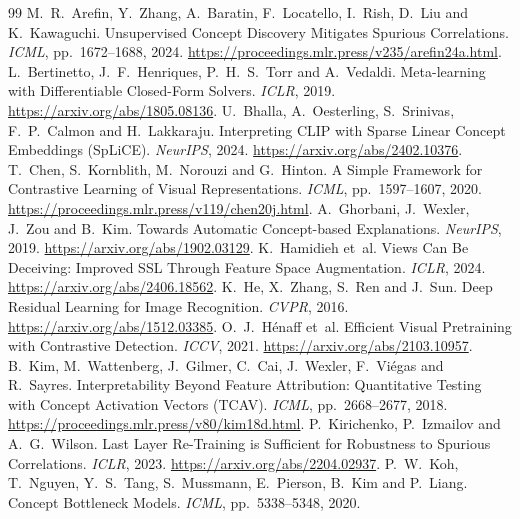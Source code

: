 \documentclass{article}
\begin{document}
\begingroup
\footnotesize
\setlength{\bibsep}{4pt plus 1pt}
\begin{thebibliography}{99}
M.~R.~Arefin, Y.~Zhang, A.~Baratin, F.~Locatello, I.~Rish, D.~Liu and K.~Kawaguchi.
Unsupervised Concept Discovery Mitigates Spurious Correlations.
\emph{ICML}, pp.~1672--1688, 2024.
\url{https://proceedings.mlr.press/v235/arefin24a.html}.
L.~Bertinetto, J.~F.~Henriques, P.~H.~S.~Torr and A.~Vedaldi.
Meta-learning with Differentiable Closed-Form Solvers. \emph{ICLR}, 2019.
\url{https://arxiv.org/abs/1805.08136}.
U.~Bhalla, A.~Oesterling, S.~Srinivas, F.~P.~Calmon and H.~Lakkaraju.
Interpreting CLIP with Sparse Linear Concept Embeddings (SpLiCE).
\emph{NeurIPS}, 2024. \url{https://arxiv.org/abs/2402.10376}.
T.~Chen, S.~Kornblith, M.~Norouzi and G.~Hinton.
A Simple Framework for Contrastive Learning of Visual Representations.
\emph{ICML}, pp.~1597--1607, 2020.
\url{https://proceedings.mlr.press/v119/chen20j.html}.
A.~Ghorbani, J.~Wexler, J.~Zou and B.~Kim.
Towards Automatic Concept-based Explanations. \emph{NeurIPS}, 2019.
\url{https://arxiv.org/abs/1902.03129}.
K.~Hamidieh et~al.
Views Can Be Deceiving: Improved SSL Through Feature Space Augmentation.
\emph{ICLR}, 2024. \url{https://arxiv.org/abs/2406.18562}.
K.~He, X.~Zhang, S.~Ren and J.~Sun.
Deep Residual Learning for Image Recognition. \emph{CVPR}, 2016.
\url{https://arxiv.org/abs/1512.03385}.
O.~J.~H\'enaff et~al.
Efficient Visual Pretraining with Contrastive Detection. \emph{ICCV}, 2021.
\url{https://arxiv.org/abs/2103.10957}.
B.~Kim, M.~Wattenberg, J.~Gilmer, C.~Cai, J.~Wexler, F.~Vi\'egas and R.~Sayres.
Interpretability Beyond Feature Attribution: Quantitative Testing with Concept Activation Vectors (TCAV).
\emph{ICML}, pp.~2668--2677, 2018. \url{https://proceedings.mlr.press/v80/kim18d.html}.
P.~Kirichenko, P.~Izmailov and A.~G.~Wilson.
Last Layer Re-Training is Sufficient for Robustness to Spurious Correlations.
\emph{ICLR}, 2023. \url{https://arxiv.org/abs/2204.02937}.
P.~W.~Koh, T.~Nguyen, Y.~S.~Tang, S.~Mussmann, E.~Pierson, B.~Kim and P.~Liang.
Concept Bottleneck Models. \emph{ICML}, pp.~5338--5348, 2020.

\end{thebibliography}
\end{document}
